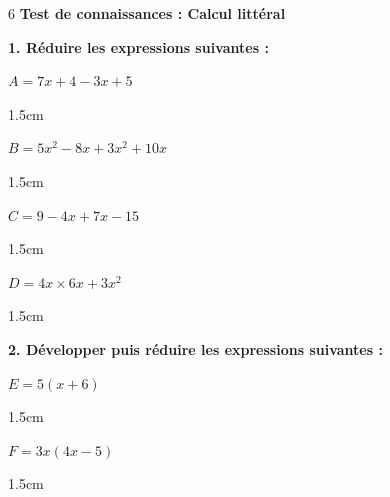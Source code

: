 \documentclass[a4paper]{book}
\begin{document}
{\newpage
\setcounter{exo}{0}
\NomPrenom
{}

\TableauCompetencesQuatre
        {}
        {}
        {}
        {}


    \begin{exerciceNote}{6}
        \textbf{Test de connaissances : Calcul littéral}
        
        \medskip
        \textbf{1. Réduire les expressions suivantes :}
        
        \noindent
        \begin{minipage}{0.48\textwidth}
            $A = 7x + 4 - 3x + 5$
            \begin{ZoneReponse}{1.5cm}
            \end{ZoneReponse}
        \end{minipage}\hfill
        \begin{minipage}{0.48\textwidth}
            $B = 5x^2 - 8x + 3x^2 + 10x$
            \begin{ZoneReponse}{1.5cm}
            \end{ZoneReponse}
        \end{minipage}
        
        \noindent
        \begin{minipage}{0.48\textwidth}
            $C = 9 - 4x + 7x - 15$
            \begin{ZoneReponse}{1.5cm}
            \end{ZoneReponse}
        \end{minipage}\hfill
        \begin{minipage}{0.48\textwidth}
            $D = 4x \times 6x + 3x^2$
            \begin{ZoneReponse}{1.5cm}
            \end{ZoneReponse}
        \end{minipage}
    
        \medskip
        \textbf{2. Développer puis réduire les expressions suivantes :}
        
        \noindent
        \begin{minipage}{0.48\textwidth}
            $E = 5(x + 6)$
            \begin{ZoneReponse}{1.5cm}
            \end{ZoneReponse}
        \end{minipage}\hfill
        \begin{minipage}{0.48\textwidth}
            $F = 3x(4x - 5)$
            \begin{ZoneReponse}{1.5cm}
            \end{ZoneReponse}
        \end{minipage}
        

\end{exerciceNote}}
\end{document}
